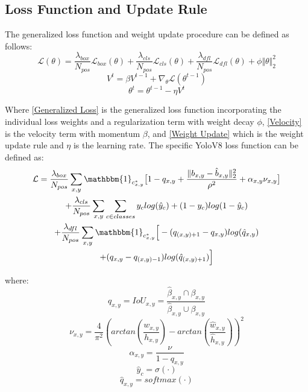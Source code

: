 \documentclass[10pt,twocolumn,letterpaper]{article}
\begin{document}
\subsection{Loss Function and Update Rule}
The generalized loss function and weight update procedure can be defined as follows: 
\begin{equation}\label{Generalized Loss}
\mathcal{L}(\theta) = \dfrac{\lambda_{box}}{N_{pos}}\mathcal{L}_{box}(\theta) + \dfrac{\lambda_{cls}}{N_{pos}}\mathcal{L}_{cls}(\theta) + \dfrac{\lambda_{dfl}}{N_{pos}}\mathcal{L}_{dfl}(\theta) + \phi\Vert \theta \Vert_2^2
\end{equation}    
\begin{equation}\label{Velocity}
V^t = \beta V^{t-1} + \nabla_{\theta}\mathcal{L}(\theta^{t-1})
\end{equation}    
\begin{equation}\label{Weight Update}
\theta^{t} = \theta^{t-1} - \eta V^{t}
\end{equation}

Where \ref{Generalized Loss} is the generalized loss function incorporating the individual loss weights and a regularization term with weight decay $\phi$, \ref{Velocity} is the velocity term with momentum $\beta$, and \ref{Weight Update} which is the weight update rule and $\eta$ is the learning rate. The specific YoloV8 loss function can be defined as:
\begin{multline}
\mathcal{L} = \dfrac{\lambda_{box}}{N_{pos}}\sum_{x,y}\mathbbm{1}_{c^*_{x,y}}\big[1 - q_{x,y} + \dfrac{\Vert b_{x,y} - \hat{b}_{x,y} \Vert_2^2}{\rho^2} + \alpha_{x,y}\nu_{x,y}\big] \\  + \dfrac{\lambda_{cls}}{N_{pos}}\sum_{x,y}\sum_{c\in classes}y_clog(\hat{y}_c) + (1 - y_c)log(1 - \hat{y}_c) \\
+ \dfrac{\lambda_{dfl}}{N_{pos}}\sum_{x,y}\mathbbm{1}_{c^*_{x,y}}\Big[-(q_{(x,y)+1} - q_{x,y})log(\hat{q}_{x,y}) \\
+ (q_{x,y} - q_{(x,y)-1})log(\hat{q}_{(x,y)+1})\Big]
\end{multline}

where:
\begin{equation*}\label{IoU}
q_{x,y} = IoU_{x,y} = \dfrac{\hat{\beta}_{x,y}\displaystyle \cap\beta_{x,y}}{\hat{\beta}_{x,y}\displaystyle \cup\beta_{x,y}}
\end{equation*}
\begin{equation*}\label{v}
\nu_{x,y} = \dfrac{4}{\pi^2}(arctan(\dfrac{w_{x,y}}{h_{x,y}}) - arctan(\dfrac{\hat{w}_{x,y}}{\hat{h}_{x,y}}))^2
\end{equation*}
\begin{equation*}\label{a}
\alpha_{x,y} = \dfrac{\nu}{1 - q_{x,y}}
\end{equation*}
\begin{equation*}\label{y_hat}
\hat{y}_c = \sigma({\cdot})
\end{equation*}
\begin{equation*}\label{q_hat}
\hat{q}_{x,y} = softmax({\cdot})
\end{equation*}
    
\end{document}
